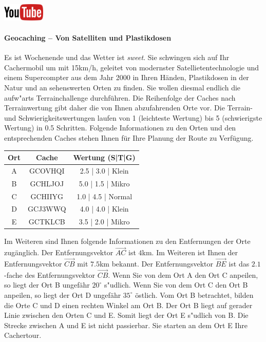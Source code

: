 \documentclass[a4paper, 9pt]{scrartcl}\usepackage[]{graphicx}\usepackage[]{xcolor}
\begin{document}
\hfill\href{https://youtu.be/3LAq3R0rS14}{\includegraphics[width =
  2cm]{img/youtube}} %
\hspace{2Ex}

\paragraph{Geocaching -- Von Satelliten und Plastikdosen}



Es ist Wochenende und das Wetter ist \textit{sweet}. Sie schwingen sich auf
Ihr Cachermobil um mit 15km/h, geleitet von modernster
Satellietentechnologie und einem Supercompter aus dem Jahr 2000 in Ihren
H{\"a}nden, Plastikdosen in der Natur und an sehenswerten Orten zu finden. Sie
wollen diesmal endlich die aufw{"a}rts Terrainchallenge
durchf{\"u}hren. Die Reihenfolge der Caches nach Terrainwertung gibt daher
die von Ihnen abzufahrenden Orte vor. Die Terrain- und
Schwierigkeitswertungen laufen von 1 (leichteste Wertung) bis 5
(schwierigste Wertung) in 0.5 Schritten. Folgende Informationen zu den
Orten und den entsprechenden Caches stehen Ihnen f{\"u}r Ihre Planung der Route
zu Verf{\"u}gung.

\begin{center}
  \begin{tabular}{ ccc }
    \toprule
    Ort & Cache & Wertung (S|T|G) \\
    \midrule
    A & GCOVHQI & 2.5 | 3.0 | Klein \\
    B & GCHLJOJ & 5.0 | 1.5 | Mikro \\ 
    C & GCHIIYG & 1.0 | 4.5 | Normal \\ 
    D & GCJ3WWQ & 4.0 | 4.0 | Klein \\ 
    E & GCTKLCB & 3.5 | 2.0 | Mikro \\     
 \bottomrule
\end{tabular}
\end{center}

Im Weiteren sind Ihnen folgende Informationen zu den Entfernungen der Orte
zug{\"a}nglich. Der Entfernungsvektor $\overrightarrow{AC}$ ist
$4$km. Im Weiteren ist Ihnen der Entfernungsvektor
$\overrightarrow{CB}$ mit $7.5$km bekannt. Der
Entfernungsvektor $\overrightarrow{BE}$ ist das $2.1$-fache
des Entfernungsvektor $\overrightarrow{CB}$. Wenn Sie von dem Ort A den Ort
C anpeilen, so liegt der Ort B ungef{\"a}hr $20^\circ$
s{"u}dlich. Wenn Sie von dem Ort C den Ort B anpeilen, so liegt
der Ort D ungef{\"a}hr $35^\circ$ {\"o}stlich. Vom Ort B
betrachtet, bilden die Orte C und D einen rechten Winkel am Ort B. Der Ort
B liegt auf gerader Linie zwischen den Orten C und E. Somit liegt der Ort E
s{"u}dlich von B. Die Strecke zwischen A und E ist nicht
passierbar. Sie starten an dem Ort E Ihre Cachertour. \\
\end{document}
